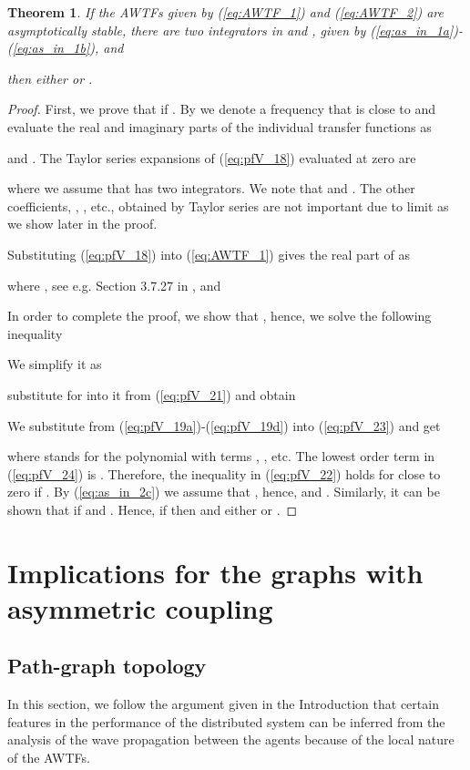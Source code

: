 \documentclass[10pt,twocolumn,twoside]{IEEEtran}
\newtheorem{theorem}{Theorem}
\theoremstyle{definition}
\begin{document}
\begin{theorem}\label{thm:two_integrators_Mf_Mr}
If the AWTFs given by (\ref{eq:AWTF_1}) and (\ref{eq:AWTF_2}) are asymptotically stable, there are two integrators in  and , given by (\ref{eq:as_in_1a})-(\ref{eq:as_in_1b}), and
  
  then either  or .
\end{theorem}
\begin{proof}
First, we prove that  if . By  we denote a frequency that is close to  and evaluate the real and imaginary parts of the individual transfer functions as

 and . The Taylor series expansions of (\ref{eq:pfV_18}) evaluated at zero are

where we assume that  has two integrators. We note that  and . The other coefficients, , , etc., obtained by Taylor series are not important due to limit  as we show later in the proof.

Substituting (\ref{eq:pfV_18}) into (\ref{eq:AWTF_1}) gives the real part of  as

where , see e.g. Section 3.7.27 in \cite{Abramowitz1964}, and


In order to complete the proof, we show that , hence, we solve the following inequality

We simplify it as

substitute for  into it from (\ref{eq:pfV_21}) and obtain

We substitute from (\ref{eq:pfV_19a})-(\ref{eq:pfV_19d}) into (\ref{eq:pfV_23}) and get

where  stands for the polynomial with terms , ,  etc. The lowest order term in (\ref{eq:pfV_24}) is . Therefore, the inequality in (\ref{eq:pfV_22}) holds for  close to zero if . By (\ref{eq:as_in_2c}) we assume that , hence,  and . Similarly, it can be shown that  if  and . Hence, if  then  and either  or .
\end{proof}


\section{Implications for the graphs with asymmetric coupling}
\subsection{Path-graph topology}


In this section, we follow the argument given in the Introduction that certain features in the performance of the distributed system can be inferred from the analysis of the wave propagation between the agents because of the local nature of the AWTFs.
\end{document}
